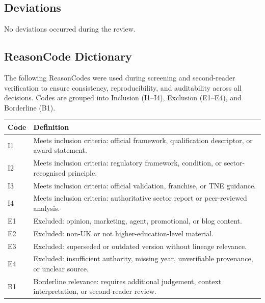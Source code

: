 \subsection{Deviations}

No deviations occurred during the review.

\subsection{ReasonCode Dictionary}

The following ReasonCodes were used during screening and second-reader
verification to ensure consistency, reproducibility, and auditability across all
decisions. Codes are grouped into Inclusion (I1--I4), Exclusion (E1--E4), and
Borderline (B1).

\begin{table}[h!]
\centering
\begin{tabular}{p{2cm} p{11cm}}
\toprule
\textbf{Code} & \textbf{Definition} \\
\midrule
I1 & Meets inclusion criteria: official framework, qualification descriptor, or award statement. \\
I2 & Meets inclusion criteria: regulatory framework, condition, or sector-recognised principle. \\
I3 & Meets inclusion criteria: official validation, franchise, or TNE guidance. \\
I4 & Meets inclusion criteria: authoritative sector report or peer-reviewed analysis. \\
\midrule
E1 & Excluded: opinion, marketing, agent, promotional, or blog content. \\
E2 & Excluded: non-UK or not higher-education-level material. \\
E3 & Excluded: superseded or outdated version without lineage relevance. \\
E4 & Excluded: insufficient authority, missing year, unverifiable provenance, or unclear source. \\
\midrule
B1 & Borderline relevance: requires additional judgement, context interpretation, or second-reader review. \\
\bottomrule
\end{tabular}
\end{table}
